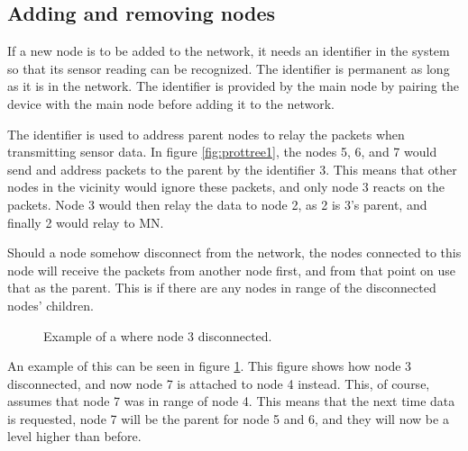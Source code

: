 \subsection{Adding and removing nodes}
If a new node is to be added to the network, it needs an identifier in the system so that its sensor reading can be recognized. The identifier is permanent as long as it is in the network.
The identifier is provided by the main node by pairing the device with the main node before adding it to the network. 

The identifier is used to address parent nodes to relay the packets when transmitting sensor data. In figure \ref{fig:prottree1}, the nodes 5, 6, and 7 would send and address packets to the parent by the identifier 3. This means that other nodes in the vicinity would ignore these packets, and only node 3 reacts on the packets. Node 3 would then relay the data to node 2, as 2 is 3's parent, and finally 2 would relay to MN.

Should a node somehow disconnect from the network, the nodes connected to this node will receive the packets from another node first, and from that point on use that as the parent. This is if there are any nodes in range of the disconnected nodes' children. 

\begin{figure}[!h]
	\centering
	\caption{Example of a where node 3 disconnected.}
	\label{fig:prottree2}
\end{figure}

An example of this can be seen in figure \ref{fig:prottree2}. This figure shows how node 3 disconnected, and now node 7 is attached to node 4 instead. This, of course, assumes that node 7 was in range of node 4.
This means that the next time data is requested, node 7 will be the parent for node 5 and 6, and they will now be a level higher than before.
